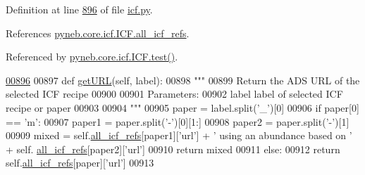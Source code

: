 Definition at line \hyperlink{icf_8py_source_l00896}{896} of file \hyperlink{icf_8py_source}{icf.\-py}.



References \hyperlink{icf_8py_source_l00680}{pyneb.\-core.\-icf.\-I\-C\-F.\-all\-\_\-icf\-\_\-refs}.



Referenced by \hyperlink{icf_8py_source_l01114}{pyneb.\-core.\-icf.\-I\-C\-F.\-test()}.


\begin{DoxyCode}
\hypertarget{classpyneb_1_1core_1_1icf_1_1_i_c_f_l00896}{}\hyperlink{classpyneb_1_1core_1_1icf_1_1_i_c_f_af27cec8e87d89720ee65fba6e28c2d9e}{00896} 
00897     \textcolor{keyword}{def }\hyperlink{classpyneb_1_1core_1_1icf_1_1_i_c_f_af27cec8e87d89720ee65fba6e28c2d9e}{getURL}(self, label): 
00898         \textcolor{stringliteral}{""" }
00899 \textcolor{stringliteral}{        Return the ADS URL of the selected ICF recipe }
00900 \textcolor{stringliteral}{        }
00901 \textcolor{stringliteral}{        Parameters:}
00902 \textcolor{stringliteral}{            label    label of selected ICF recipe or paper}
00903 \textcolor{stringliteral}{}
00904 \textcolor{stringliteral}{        """}        
00905         paper = label.split(\textcolor{stringliteral}{'\_'})[0]
00906         \textcolor{keywordflow}{if} paper[0] == \textcolor{stringliteral}{'m'}:
00907             paper1 = paper.split(\textcolor{stringliteral}{'-'})[0][1:]
00908             paper2 = paper.split(\textcolor{stringliteral}{'-'})[1]
00909             mixed = self.\hyperlink{classpyneb_1_1core_1_1icf_1_1_i_c_f_a9777abc7cc843cd5c4d8c5810c1b2ed1}{all\_icf\_refs}[paper1][\textcolor{stringliteral}{'url'}] + \textcolor{stringliteral}{' using an abundance based on '} + self.
      \hyperlink{classpyneb_1_1core_1_1icf_1_1_i_c_f_a9777abc7cc843cd5c4d8c5810c1b2ed1}{all\_icf\_refs}[paper2][\textcolor{stringliteral}{'url'}]
00910             \textcolor{keywordflow}{return} mixed
00911         \textcolor{keywordflow}{else}:
00912             \textcolor{keywordflow}{return} self.\hyperlink{classpyneb_1_1core_1_1icf_1_1_i_c_f_a9777abc7cc843cd5c4d8c5810c1b2ed1}{all\_icf\_refs}[paper][\textcolor{stringliteral}{'url'}]
00913    
    
\end{DoxyCode}
